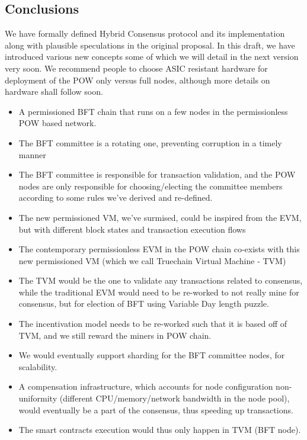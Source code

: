 \documentclass[9pt,oneside]{amsart}
\begin{document}
\begin{multicols}{2}
\section{Conclusions}

We have formally defined Hybrid Consensus protocol and its implementation along with plausible speculations in the original
proposal. In this draft, we have introduced various new concepts some of which we will detail in the next version very soon.
We recommend people to choose ASIC resistant hardware for deployment of the POW only versus full nodes,
although more details on hardware shall follow soon.

\begin{itemize}
  \item A permissioned BFT chain that runs on a few nodes in the permissionless POW based network.
  \item The BFT committee is a rotating one, preventing corruption in a timely manner
  \item The BFT committee is responsible for transaction validation, and the POW nodes are only responsible for choosing/electing the committee members according to some rules we've derived and re-defined.
  \item The new permissioned VM, we've surmised, could be inspired from the EVM, but with different block states and transaction execution flows
  \item The contemporary permissionless EVM in the POW chain co-exists with this new permissioned VM (which we call Truechain Virtual Machine - TVM)
  \item The TVM would be the one to validate any transactions related to consensus, while the traditional EVM would need to be re-worked to not really mine for consensus, but for election of BFT using Variable Day length puzzle.
  \item The incentivation model needs to be re-worked such that it is based off of TVM, and we still reward the miners in POW chain.
  \item We would eventually support sharding for the BFT committee nodes, for scalability.
  \item A compensation infrastructure, which accounts for node configuration non-uniformity (different CPU/memory/network bandwidth in the node pool), would eventually be a part of the consensus, thus speeding up transactions.
  \item The smart contracts execution would thus only happen in TVM (BFT node).
\end{itemize}



\end{multicols}
\end{document}
